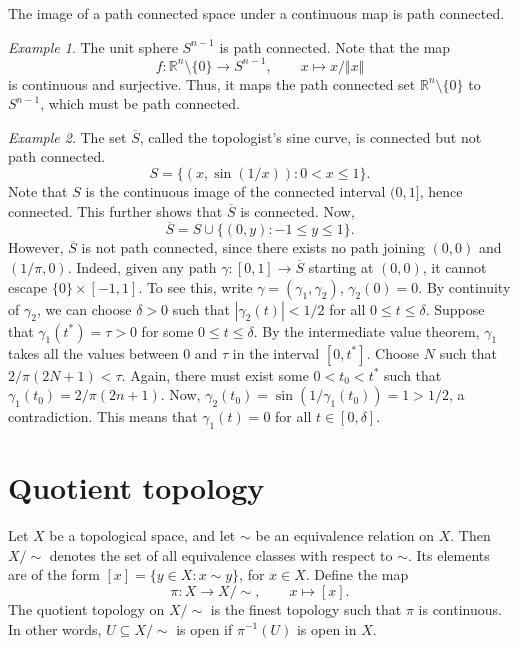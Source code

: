 \documentclass[11pt]{article}
\newcommand{\R}{\mathbb{R}}
\newcommand{\norm}[1]{\Vert #1 \Vert}
\theoremstyle{definition}
\theoremstyle{remark}
\newtheorem*{example}{Example}
\numberwithin{equation}{section}
\begin{document}
    \begin{lemma}
        The image of a path connected space under a continuous map is path connected.
    \end{lemma}
    \begin{example}
        The unit sphere $S^{n - 1}$ is path connected. Note that the map \[
            f\colon \R^n\setminus\{0\} \to S^{n - 1}, \qquad x \mapsto x / \norm{x}
        \] is continuous and surjective. Thus, it maps the path connected set
        $\R^n\setminus\{0\}$ to $S^{n - 1}$, which must be path connected.
    \end{example}
    \begin{example}
        The set $\overline{S}$, called the topologist's sine curve, is connected but
        not path connected. \[
            S = \{(x, \sin(1 / x)): 0 < x \leq 1\}.
        \] Note that $S$ is the continuous image of the connected interval $(0, 1]$,
        hence connected. This further shows that $\overline{S}$ is connected. Now, \[
            \overline{S} = S \cup \{(0, y): -1 \leq y \leq 1\}.
        \] However, $\overline{S}$ is not path connected, since there exists no path
        joining $(0, 0)$ and $(1 / \pi, 0)$. Indeed, given any path $\gamma\colon [0,
        1] \to \overline{S}$ starting at $(0, 0)$, it cannot escape $\{0\}\times [-1,
        1]$. To see this, write $\gamma = (\gamma_1, \gamma_2)$, $\gamma_2(0) = 0$.
        By continuity of $\gamma_2$, we can choose $\delta > 0$ such that
        $|\gamma_2(t)| < 1 / 2$ for all $0 \leq t \leq \delta$. Suppose that
        $\gamma_1(t^*) = \tau > 0$ for some $0 \leq t \leq \delta$. By the
        intermediate value theorem, $\gamma_1$ takes all the values between $0$ and
        $\tau$ in the interval $[0, t^*]$. Choose $N$ such that $2 / \pi(2N + 1) <
        \tau$. Again, there must exist some $0 < t_0 < t^*$ such that $\gamma_1(t_0)
        = 2 / \pi(2n + 1)$. Now, $\gamma_2(t_0) = \sin(1 / \gamma_1(t_0)) = 1 > 1 /
        2$, a contradiction. This means that $\gamma_1(t) = 0$ for all $t \in [0,
        \delta]$.
    \end{example}


    \section{Quotient topology}
    
    \begin{definition}
        Let $X$ be a topological space, and let $\sim$ be an equivalence relation on
        $X$. Then $X/\!\sim$ denotes the set of all equivalence classes with respect
        to $\sim$. Its elements are of the form $[x] = \{y \in X : x \sim y\}$, for
        $x \in X$. Define the map \[
            \pi\colon X \to X/\!\sim, \qquad x \mapsto [x].
        \] The quotient topology on $X/\sim$ is the finest topology such that $\pi$
        is continuous. In other words, $U \subseteq X/\!\sim$ is open if
        $\pi^{-1}(U)$ is open in $X$.
    \end{definition}
\end{document}
